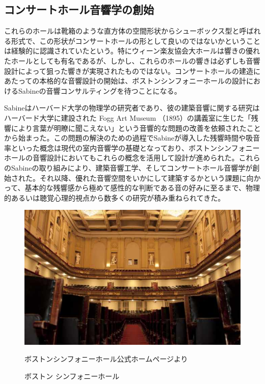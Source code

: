 \documentclass[11pt,a4j]{jreport}
\begin{document}
\newpage
\subsection*{コンサートホール音響学の創始}

これらのホールは靴箱のような直方体の空間形状からシューボックス型と呼ばれる形式で、この形状がコンサートホールの形として良いのではないかということは経験的に認識されていたという。特にウィーン楽友協会大ホールは響きの優れたホールとしても有名であるが、しかし、これらのホールの響きは必ずしも音響設計によって狙った響きが実現されたものではない。コンサートホールの建造にあたっての本格的な音響設計の開始は、ボストンシンフォニーホールの設計におけるSabineの音響コンサルティングを待つことになる\cite{清水寧2023}。

Sabineはハーバード大学の物理学の研究者であり、彼の建築音響に関する研究はハーバード大学に建設された Fogg Art Museum （1895）の講義室に生じた「残響により言葉が明瞭に聞こえない」という音響的な問題の改善を依頼されたことから始まった。この問題の解決のための過程でSabineが導入した残響時間や吸音率といった概念は現代の室内音響学の基礎となっており、ボストンシンフォニーホールの音響設計においてもこれらの概念を活用して設計が進められた。これらのSabineの取り組みにより、建築音響工学、そしてコンサートホール音響学が創始された\cite{sabine2005}。それ以降、優れた音響空間をいかにして建築するかという課題に向かって、基本的な残響感から極めて感性的な判断である音の好みに至るまで、物理的あるいは聴覚心理的視点から数多くの研究が積み重ねられてきた。


\begin{figure}[H]
  \centering
  \includegraphics[width=.45\linewidth]{images/pictureCitation/resized/bostonSymphony.jpg}
  \caption{ボストン シンフォニーホール}
  \label{fig:ボストンシンフォニーホール}
  \footnotesize ボストンシンフォニーホール公式ホームページより \cite{bostonSymphony}
\end{figure}


\newpage
\end{document}
